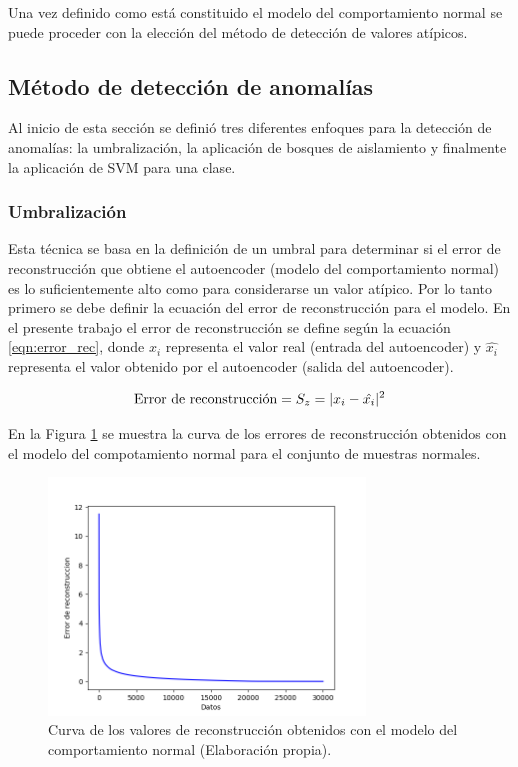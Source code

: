 \vspace{5mm} %

Una vez definido como est\'{a} constituido el modelo del comportamiento normal se puede proceder con la elecci\'{o}n del m\'{e}todo de detecci\'{o}n de valores at\'{i}picos.

\subsection{M\'{e}todo de detecci\'{o}n de anomal\'{i}as}

Al inicio de esta secci\'{o}n se defini\'{o} tres diferentes enfoques para la detecci\'{o}n de anomal\'{i}as: la umbralizaci\'{o}n, la aplicaci\'{o}n de bosques de aislamiento y finalmente la aplicaci\'{o}n de SVM para una clase.

\subsubsection{Umbralizaci\'{o}n}

Esta t\'{e}cnica se basa en la definici\'{o}n de un umbral para determinar si el error de reconstrucci\'{o}n  que obtiene el autoencoder (modelo del comportamiento normal) es lo suficientemente alto como para considerarse un valor at\'{i}pico. Por lo tanto primero se debe definir la ecuaci\'{o}n del error de reconstrucci\'{o}n para el modelo. En el presente trabajo el error de reconstrucci\'{o}n se define seg\'{u}n la ecuaci\'{o}n \ref{eqn:error_rec}, donde $x_{i}$ representa el valor real (entrada del autoencoder) y $\hat{x_{i}}$ representa el valor obtenido por el autoencoder (salida del autoencoder).

\begin{equation}
\textup{Error de reconstrucci\'{o}n} = S_{z} = |x_{i} - \hat{x_{i}}|^{2} 
\label{eqn:error_rec}
\end{equation}

En la Figura \ref{fig:codos} se muestra la curva de los errores de reconstrucci\'{o}n obtenidos con el modelo del compotamiento normal para el conjunto de muestras normales.

\begin{figure}[H]
        \centering
            \includegraphics[width=0.75\textwidth, frame]{imagenes/Cap5/codos}
        \caption{Curva de los valores de reconstrucci\'{o}n obtenidos con el modelo del comportamiento normal (Elaboraci\'{o}n propia).}
		\label{fig:codos}
    \end{figure}

